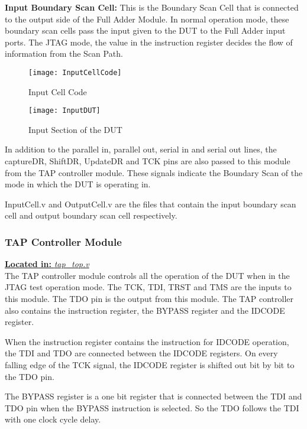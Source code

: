 \documentclass[a4paper,11pt]{article}
\begin{document}
\FloatBarrier
\textbf{Input Boundary Scan Cell:}
This is the Boundary Scan Cell that is connected to the output side of the Full Adder Module. In normal operation mode, these boundary scan cells pass the input given to the DUT to the Full Adder input ports. The JTAG mode, the value in the instruction register decides the flow of information from the Scan Path.

\begin{figure}[ht]
\centering
\texttt{[image: InputCellCode]}
\caption{Input Cell Code}
\label{fig: Input Cell Code}
\end{figure}

\begin{figure}[ht]
\centering
\texttt{[image: InputDUT]}
\caption{Input Section of the DUT}
\label{fig: Input DUT}
\end{figure}

In addition to the parallel in, parallel out, serial in and serial out lines, the captureDR, ShiftDR, UpdateDR and TCK pins are also passed to this module from the TAP controller module. These signals indicate the Boundary Scan of the mode in which the DUT is operating in.

InputCell.v and OutputCell.v are the files that contain the input boundary scan cell and output boundary scan cell respectively.


\FloatBarrier
\subsubsection{TAP Controller Module}
\underline{\textbf{Located in:} \textit{tap\_top.v}}\\

The TAP controller module controls all the operation of the DUT when in the JTAG test operation mode. The TCK, TDI, TRST and TMS are the inputs to this module. The TDO pin is the output from this module. The TAP controller also contains the instruction register, the BYPASS register and the IDCODE register.

When the instruction register contains the instruction for IDCODE operation, the TDI and TDO are connected between the IDCODE registers. On every falling edge of the TCK signal, the IDCODE register is shifted out bit by bit to the TDO pin.

The BYPASS register is a one bit register that is connected between the TDI and TDO pin when the BYPASS instruction is selected. So the TDO follows the TDI with one clock cycle delay.
\end{document}
